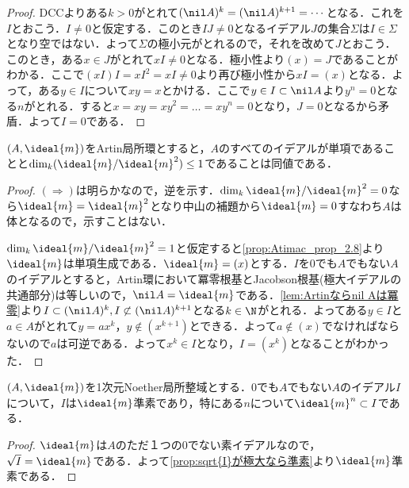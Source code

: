 \begin{proof}
	DCCよりある$k>0$がとれて$(\nil A)^k=(\nil A)^{k+1}=\cdots$となる．これを$I$とおこう．$I\neq0$と仮定する．このとき$IJ\neq0$となるイデアル$J$の集合$\Sigma$は$I\in\Sigma$となり空ではない．よって$\Sigma$の極小元がとれるので，それを改めて$J$とおこう．このとき，ある$x\in J$がとれて$xI\neq0$となる．極小性より$(x)=J$であることがわかる．ここで$(xI)I=xI^2=xI\neq0$より再び極小性から$xI=(x)$となる．よって，ある$y\in I$について$xy=x$とかける．ここで$y\in I\subset\nil A$より$y^n=0$となる$n$がとれる．すると$x=xy=xy^2=\dots=xy^n=0$となり，$J=0$となるから矛盾．よって$I=0$である．
\end{proof}

\begin{prop}\label{lem:DVR-B}
	$(A,\ideal{m})$をArtin局所環とすると，$A$のすべてのイデアルが単項であることと$\dim_k(\ideal{m}/\ideal{m}^2)\leq1$であることは同値である．
\end{prop}

\begin{proof}
	$(\Longrightarrow)$は明らかなので，逆を示す．$\dim_k \ideal{m}/\ideal{m}^2=0$なら$\ideal{m}=\ideal{m}^2$となり中山の補題から$\ideal{m}=0$すなわち$A$は体となるので，示すことはない．
	
	$\dim_k \ideal{m}/\ideal{m}^2=1$と仮定すると\ref{prop:Atimac_prop_2.8}より$\ideal{m}$は単項生成である．$\ideal{m}=(x)$とする．$I$を$0$でも$A$でもない$A$のイデアルとすると，Artin環において冪零根基とJacobson根基(極大イデアルの共通部分)は等しいので，$\nil A=\ideal{m}$である．\ref{lem:Artinならnil Aは冪零}より$I\subset(\nil A)^k,I\not\subset(\nil A)^{k+1}$となる$k\in\N$がとれる．よってある$y\in I$と$a\in A$がとれて$y=ax^k，y\not\in(x^{k+1})$とできる．よって$a\not\in(x)$でなければならないので$a$は可逆である．よって$x^k\in I$となり，$I=(x^k)$となることがわかった．
\end{proof}

\begin{lem}\label{lem:DVR-C}
	$(A,\ideal{m})$を1次元Noether局所整域とする．$0$でも$A$でもない$A$のイデアル$I$について，$I$は$\ideal{m}$準素であり，特にある$n$について$\ideal{m}^n\subset I$である．
\end{lem}

\begin{proof}
	$\ideal{m}$は$A$のただ１つの0でない素イデアルなので，$\sqrt{I}=\ideal{m}$である．よって\ref{prop:sqrt{I}が極大なら準素}より$\ideal{m}$準素である．
\end{proof}

